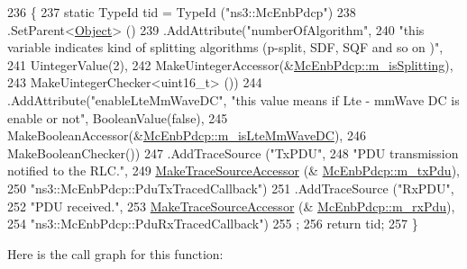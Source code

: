 \begin{DoxyCode}
236 \{
237   \textcolor{keyword}{static} TypeId tid = TypeId (\textcolor{stringliteral}{"ns3::McEnbPdcp"})
238     .SetParent<\hyperlink{classns3_1_1Object_a40860402e64d8008fb42329df7097cdb}{Object}> ()
239         .AddAttribute(\textcolor{stringliteral}{"numberOfAlgorithm"},
240                         \textcolor{stringliteral}{"this variable indicates kind of splitting algorithms (p-split, SDF, SQF and so on
       )"},
241                         UintegerValue(2),
242                         MakeUintegerAccessor(&\hyperlink{classns3_1_1McEnbPdcp_a362ac09ce1bb709d298ca2f668caaff1}{McEnbPdcp::m\_isSplitting}),
243                         MakeUintegerChecker<uint16\_t> ())
244         .AddAttribute(\textcolor{stringliteral}{"enableLteMmWaveDC"}, \textcolor{stringliteral}{"this value means if Lte - mmWave DC is enable or not"}, 
      BooleanValue(\textcolor{keyword}{false}),
245                         MakeBooleanAccessor(&\hyperlink{classns3_1_1McEnbPdcp_a84449b23303f48d8e9cd509fd7733bac}{McEnbPdcp::m\_isLteMmWaveDC}),
246                         MakeBooleanChecker())
247     .AddTraceSource (\textcolor{stringliteral}{"TxPDU"},
248                      \textcolor{stringliteral}{"PDU transmission notified to the RLC."},
249                      \hyperlink{group__tracing_gab21a770b9855af4e8f69f7531ea4a6b0}{MakeTraceSourceAccessor} (&
      \hyperlink{classns3_1_1McEnbPdcp_a48d23e15667a3d5cc447019b595196ba}{McEnbPdcp::m\_txPdu}),
250                      \textcolor{stringliteral}{"ns3::McEnbPdcp::PduTxTracedCallback"})
251     .AddTraceSource (\textcolor{stringliteral}{"RxPDU"},
252                      \textcolor{stringliteral}{"PDU received."},
253                      \hyperlink{group__tracing_gab21a770b9855af4e8f69f7531ea4a6b0}{MakeTraceSourceAccessor} (&
      \hyperlink{classns3_1_1McEnbPdcp_af263990d8ad04a88ad3d6a4fba42c976}{McEnbPdcp::m\_rxPdu}),
254                      \textcolor{stringliteral}{"ns3::McEnbPdcp::PduRxTracedCallback"})
255     ;
256   \textcolor{keywordflow}{return} tid;
257 \}
\end{DoxyCode}


Here is the call graph for this function\+:


